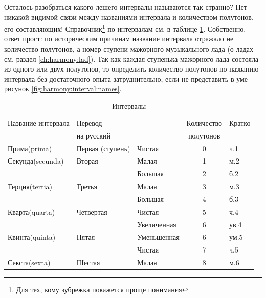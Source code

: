 Осталось разобраться какого лешего интервалы называются так странно? Нет никакой видимой связи между названиями интервала и количеством полутонов, его составляющих! Справочник\footnote{Для тех, кому зубрежка покажется проще понимания} по интервалам см. в таблице \ref{t:harmony:interval:names}. Собственно, ответ прост: по историческим причинам название интервала отражало не количество полутонов, а номер ступени мажорного музыкального лада (о ладах см. раздел \ref{ch:harmony:lad}). Так как каждая ступенька мажорного лада состояла из одного или двух полутонов, то определить количество полутонов по названию интервала без достаточного опыта затруднительно, если не представить в уме рисунок \ref{fig:harmony:interval:names}.

\begin{table}[!ht]
    \caption{Интервалы}
    \label{t:harmony:interval:names}
    \centering
    \begin{tabular}{l|l|l|c|l}
        \hline\hline
        Название интервала & Перевод            &               & Количество  & Кратко  \\
                           & на русский         &               & полутонов   &         \\
        \hline\hline
        Прима(prima)       & Первая (ступень)   & Чистая        & 0                 & ч.1 \\
        Секунда(secunda)   & Вторая             & Малая         & 1                 & м.2 \\
                           &                    & Большая       & 2                 & б.2 \\
        Терция(tertia)     & Третья             & Малая         & 3                 & м.3 \\
                           &                    & Большая       & 4                 & б.3 \\
        Кварта(quarta)     & Четвертая          & Чистая        & 5                 & ч.4 \\
                           &                    & Увеличенная   & 6                 & ув.4\\
        Квинта(quinta)     & Пятая              & Уменьшенная   & 6                 & ум.5\\
                           &                    & Чистая        & 7                 & ч.5 \\
        Секста(sexta)      & Шестая             & Малая         & 8                 & м.6 \\

\end{tabular}
\end{table}
